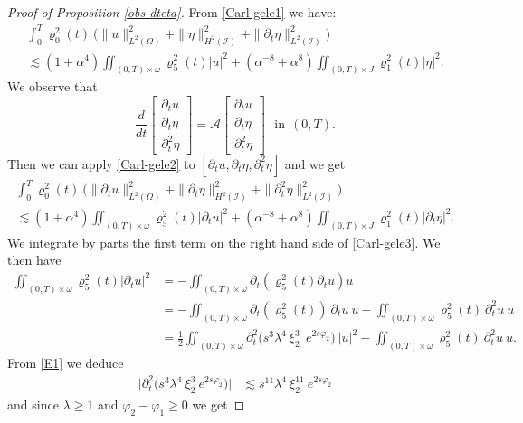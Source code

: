 \documentclass[a4paper, 12pt]{article}
\theoremstyle{plain}
\theoremstyle{definition}
\numberwithin{theorem}{section}
\numberwithin{equation}{section}
\begin{document}
{\begin{proof}[Proof of Proposition \ref{obs-dteta}]
From \eqref{Carl-gele1} we have:
\begin{multline}\label{Carl-gele2}
\int_{0}^T\varrho^2_0(t)~\big(\|u\|_{L^2(\Omega)}^2+\|\eta\|^2_{H^2(\mathcal{I})}+\|\partial_t\eta\|^2_{L^2(\mathcal{I})}\big)\\
\lesssim (1+\alpha^4)\iint_{(0,T)\times\omega}\varrho^2_5(t)| u|^2+ \left(\alpha^{-8}+\alpha^8\right)\iint_{(0,T)\times J}\varrho^2_1(t)|\eta|^2.
\end{multline}
We observe that 
$$
\frac{d}{dt}\begin{bmatrix}
    \partial_tu\\
    \partial_t\eta\\
    \partial_t^2\eta
\end{bmatrix}=\mathcal{A}\begin{bmatrix}
    \partial_tu\\
    \partial_t\eta\\
    \partial_t^2\eta
\end{bmatrix}~~~\text{in}~~(0,T).
$$
Then we can apply \eqref{Carl-gele2} to $[\partial_tu,\partial_t\eta,\partial^2_t\eta]$ and we get
\begin{multline}\label{Carl-gele3}
\int_{0}^T\varrho^2_0(t)~\big(\|\partial_tu\|_{L^2(\Omega)}^2+\|\partial_t\eta\|^2_{H^2(\mathcal{I})}+\|\partial^2_t\eta\|^2_{L^2(\mathcal{I})}\big)\\
\lesssim (1+\alpha^4)\iint_{(0,T)\times\omega}\varrho^2_5(t)|\partial_tu|^2+ \left(\alpha^{-8}+\alpha^8\right)\iint_{(0,T)\times J}\varrho^2_1(t)|\partial_t\eta|^2.
\end{multline}
 We integrate by parts the first term on the right hand side of \eqref{Carl-gele3}. We then have 
 \begin{align*}
    \iint_{(0,T)\times\omega}\varrho^2_5(t)|\partial_tu|^2&=-\iint_{(0,T)\times\omega}\partial_t(\varrho^2_5(t)\partial_tu)u
    \\&=-\iint_{(0,T)\times\omega}\partial_t(\varrho^2_5(t))~\partial_tu~u-\iint_{(0,T)\times\omega}\varrho^2_5(t)~\partial^2_tu~u\\
    &=\frac12\iint_{(0,T)\times\omega}\partial^2_t\big(s^3\lambda^4~ \xi^3_2~~e^{2s\varphi_2}\big)~|u|^2-\iint_{(0,T)\times\omega}\varrho^2_5(t)~\partial^2_tu~u.
 \end{align*}
From \eqref{E1} we deduce
 \begin{align*}
  \big|\partial^2_t\big(s^3\lambda^4~ \xi^3_2~e^{2s\varphi_2}\big)\big|&\lesssim  s^{11}\lambda^4~\xi^{11}_2~e^{2s\varphi_2}
 \end{align*}
 and since $\lambda \geq 1$ and $\varphi_2-\varphi_1\geq 0$ we get

\end{proof}}
\end{document}
